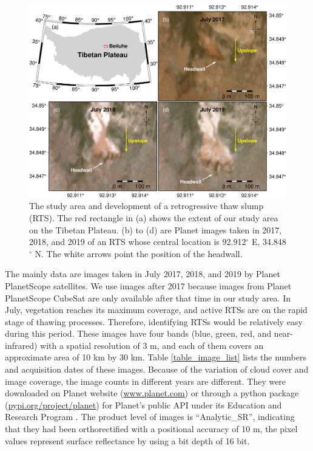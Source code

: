 \documentclass[authoryear,preprint,review,12pt]{elsarticle}
\begin{document}
\begin{figure} 
	\centering
	\includegraphics[width=14cm]{figs/rts_multi_images_study_area_v3.jpg}
	\caption{The study area and development of a retrogressive thaw slump (RTS). The red 
	rectangle in (a) shows the extent of our study area
	on the Tibetan Plateau. (b) to (d) are Planet images taken in 2017, 2018, and 2019 of an RTS whose central location is 92.912$^\circ$ E, 34.848$^\circ$ N. The white arrows point the position of the headwall.} %
	\label{fig_multi_rts_image_studyarea}
\end{figure}


The mainly data are images taken in July 2017, 2018, and 2019 by Planet PlanetScope satellites.
We use images after 2017 because images from Planet PlanetScope CubeSat are only available after that time in our study area.  
In July, vegetation reaches its maximum coverage, and active RTSs are on the rapid stage of thawing processes. 
Therefore, identifying RTSs would be relatively easy during this period.
These images have four bands (blue, green, red, and near-infrared) with a spatial resolution of 3 m, and each of them covers an approximate area of 10 km by 30 km.
Table \ref{table_image_list} lists the numbers and acquisition dates of these images. 
Because of the variation of cloud cover and image coverage, the image counts in different years are different.
They were downloaded on Planet website (\url{www.planet.com}) or through a python package (\url{pypi.org/project/planet}) for Planet's public API under its Education and Research Program \citep{team2018planet}. 
The product level of images is ``Analytic\_SR'', indicating that they had been orthorectified with a positional accuracy of 10 m, the pixel values represent surface reflectance by using a bit depth of 16 bit. 
\end{document}
